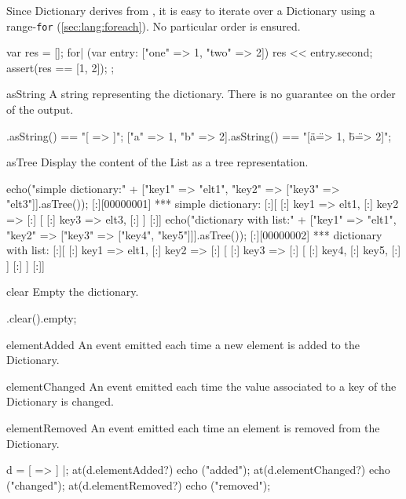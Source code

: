 \begin{urbiscriptapi}
  \noindent
  Since Dictionary derives from , it is easy to
  iterate over a Dictionary using a range-\lstinline|for|
  (\autoref{sec:lang:foreach}).  No particular order is ensured.
\begin{urbiscript}
{
  var res = [];
  for| (var entry: ["one" => 1, "two" => 2])
    res << entry.second;
  assert(res == [1, 2]);
};
\end{urbiscript}


\item[asString] A string representing the dictionary.  There is no guarantee
  on the order of the output.
\begin{urbiassert}
                [=>].asString() == "[ => ]";
["a" => 1, "b" => 2].asString() == "[\"a\" => 1, \"b\" => 2]";
\end{urbiassert}

\item[asTree]%
Display the content of the List as a tree representation.
\begin{urbiscript}
echo("simple dictionary:" + ["key1" => "elt1", "key2" => ["key3" => "elt3"]].asTree());
[:][00000001] *** simple dictionary:
[:][
[:]  key1 => elt1,
[:]  key2 =>
[:]  [
[:]    key3 => elt3,
[:]  ]
[:]]
echo("dictionary with list:" +
  ["key1" => "elt1", "key2" => ["key3" => ["key4", "key5"]]].asTree());
[:][00000002] *** dictionary with list:
[:][
[:]  key1 => elt1,
[:]  key2 =>
[:]  [
[:]    key3 =>
[:]    [
[:]      key4,
[:]      key5,
[:]    ]
[:]  ]
[:]]
\end{urbiscript}

\item[clear]
  Empty the dictionary.

\begin{urbiassert}
["one" => 1].clear().empty;
\end{urbiassert}


\item[elementAdded] An event emitted each time a new element is added to
  the Dictionary.


\item[elementChanged] An event emitted each time the value associated to a
  key of the Dictionary is changed.


\item[elementRemoved] An event emitted each time an element is removed from
  the Dictionary.

\begin{urbiscript}
d = [ => ] |;
at(d.elementAdded?) echo ("added");
at(d.elementChanged?) echo ("changed");
at(d.elementRemoved?) echo ("removed");


\end{urbiscript}
\end{urbiscriptapi}
